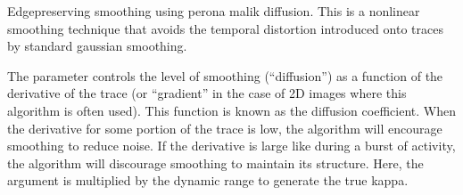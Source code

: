 \documentclass[letterpaper,10pt,english]{sphinxmanual}
\begin{document}

\begin{fulllineitems}
\label{\detokenize{CalSciPy.trace_processing:CalSciPy.trace_processing.perona_malik_diffusion}}
\pysigstartsignatures
{}
\pysigstopsignatures
\sphinxAtStartPar
Edge\sphinxhyphen{}preserving smoothing using perona malik diffusion. This is a non\sphinxhyphen{}linear smoothing technique that avoids the
temporal distortion introduced onto traces by standard gaussian smoothing.

\sphinxAtStartPar
The parameter  controls the level of smoothing (“diffusion”) as a function of the derivative of the trace
(or “gradient” in the case of 2D images where this algorithm is often used). This function is known as the
diffusion coefficient. When the derivative for some portion of the trace is low, the algorithm will encourage
smoothing to reduce noise. If the derivative is large like during a burst of activity, the algorithm will discourage
smoothing to maintain its structure. Here, the argument  is multiplied by the dynamic range to generate the
true kappa.


\end{fulllineitems}
\end{document}
